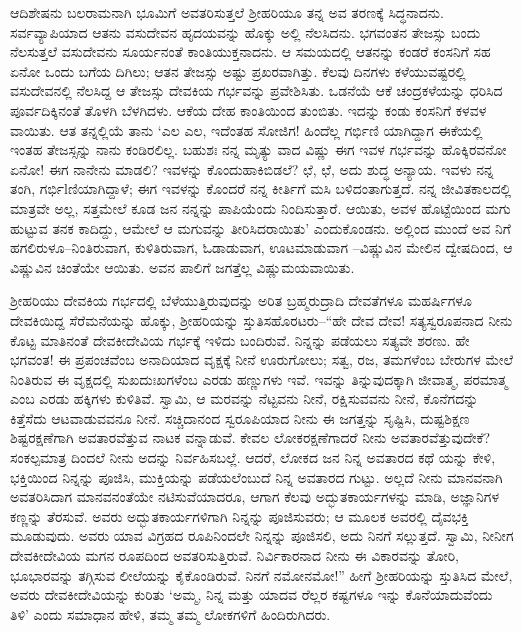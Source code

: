 ಆದಿಶೇಷನು ಬಲರಾಮನಾಗಿ ಭೂಮಿಗೆ ಅವತರಿಸುತ್ತಲೆ ಶ್ರೀಹರಿಯೂ ತನ್ನ ಅವ ತರಣಕ್ಕೆ ಸಿದ್ಧನಾದನು. ಸರ್ವವ್ಯಾಪಿಯಾದ ಆತನು ವಸುದೇವನ ಹೃದಯವನ್ನು ಹೊಕ್ಕು ಅಲ್ಲಿ ನೆಲಸಿದನು. ಭಗವಂತನ ತೇಜಸ್ಸು ಬಂದು ನೆಲಸುತ್ತಲೆ ವಸುದೇವನು ಸೂರ್ಯನಂತೆ ಕಾಂತಿಯುಕ್ತನಾದನು. ಆ ಸಮಯದಲ್ಲಿ ಆತನನ್ನು ಕಂಡರೆ ಕಂಸನಿಗೆ ಸಹ ಏನೋ ಒಂದು ಬಗೆಯ ದಿಗಿಲು; ಆತನ ತೇಜಸ್ಸು ಅಷ್ಟು ಪ್ರಖರವಾಗಿತ್ತು. ಕೆಲವು ದಿನಗಳು ಕಳೆಯುವಷ್ಟರಲ್ಲಿ ವಸುದೇವನಲ್ಲಿ ನೆಲಸಿದ್ದ ಆ ತೇಜಸ್ಸು ದೇವಕಿಯ ಗರ್ಭವನ್ನು ಪ್ರವೇಶಿಸಿತು. ಒಡನೆಯೆ ಆಕೆ ಚಂದ್ರಕಳೆಯನ್ನು ಧರಿಸಿದ ಪೂರ್ವದಿಕ್ಕಿನಂತೆ ತೊಳಗಿ ಬೆಳಗಿದಳು. ಆಕೆಯ ದೇಹ ಕಾಂತಿಯಿಂದ ತುಂಬಿತು. ಇದನ್ನು ಕಂಡು ಕಂಸನಿಗೆ ಕಳವಳ ವಾಯಿತು. ಆತ ತನ್ನಲ್ಲಿಯೆ ತಾನು ‘ಎಲ ಎಲ, ಇದೆಂತಹ ಸೋಜಿಗ! ಹಿಂದೆಲ್ಲ ಗರ್ಭಿಣಿ ಯಾಗಿದ್ದಾಗ ಈಕೆಯಲ್ಲಿ ಇಂತಹ ತೇಜಸ್ಸನ್ನು ನಾನು ಕಂಡಿರಲಿಲ್ಲ. ಬಹುಶಃ ನನ್ನ ಮೃತ್ಯು ವಾದ ವಿಷ್ಣು ಈಗ ಇವಳ ಗರ್ಭವನ್ನು ಹೊಕ್ಕಿರವನೋ ಏನೋ! ಈಗ ನಾನೇನು ಮಾಡಲಿ? ಇವಳನ್ನು ಕೊಂದುಹಾಕಿಬಿಡಲೆ? ಛೆ, ಛೆ, ಅದು ಶುದ್ಧ ಅನ್ಯಾಯ. ಇವಳು ನನ್ನ ತಂಗಿ, ಗರ್ಭಿlಣಿಯಾಗಿದ್ದಾಳೆ; ಈಗ ಇವಳನ್ನು ಕೊಂದರೆ ನನ್ನ ಕೀರ್ತಿಗೆ ಮಸಿ ಬಳಿದಂತಾಗುತ್ತದೆ. ನನ್ನ ಜೀವಿತಕಾಲದಲ್ಲಿ ಮಾತ್ರವೇ ಅಲ್ಲ, ಸತ್ತಮೇಲೆ ಕೂಡ ಜನ ನನ್ನನ್ನು ಪಾಪಿಯೆಂದು ನಿಂದಿಸುತ್ತಾರೆ. ಆಯಿತು, ಅವಳ ಹೊಟ್ಟೆಯಿಂದ ಮಗು ಹುಟ್ಟುವ ತನಕ ಕಾದಿದ್ದು, ಆಮೇಲೆ ಆ ಮಗುವನ್ನು ತೀರಿಸಿದರಾಯಿತು’ ಎಂದುಕೊಂಡನು. ಅಲ್ಲಿಂದ ಮುಂದೆ ಅವ ನಿಗೆ ಹಗಲಿರುಳೂ–ನಿಂತಿರುವಾಗ, ಕುಳಿತಿರುವಾಗ, ಓಡಾಡುವಾಗ, ಊಟಮಾಡುವಾಗ –ವಿಷ್ಣುವಿನ ಮೇಲಿನ ದ್ವೇಷದಿಂದ, ಆ ವಿಷ್ಣುವಿನ ಚಿಂತೆಯೇ ಆಯಿತು. ಅವನ ಪಾಲಿಗೆ ಜಗತ್ತೆಲ್ಲ ವಿಷ್ಣುಮಯವಾಯಿತು.

ಶ್ರೀಹರಿಯು ದೇವಕಿಯ ಗರ್ಭದಲ್ಲಿ ಬೆಳೆಯುತ್ತಿರುವುದನ್ನು ಅರಿತ ಬ್ರಹ್ಮರುದ್ರಾದಿ ದೇವತೆಗಳೂ ಮಹರ್ಷಿಗಳೂ ದೇವಕಿಯಿದ್ದ ಸೆರೆಮನೆಯನ್ನು ಹೊಕ್ಕು, ಶ್ರೀಹರಿಯನ್ನು ಸ್ತುತಿಸಹೊರಟರು–“ಹೇ ದೇವ ದೇವ! ಸತ್ಯಸ್ವರೂಪನಾದ ನೀನು ಕೊಟ್ಟ ಮಾತಿನಂತೆ ದೇವಕೀದೇವಿಯ ಗರ್ಭಕ್ಕೆ ಇಳಿದು ಬಂದಿರುವೆ. ನಿನ್ನನ್ನು ಪಡೆಯಲು ಸತ್ಯವೇ ಶರಣು. ಹೇ ಭಗವಂತ! ಈ ಪ್ರಪಂಚವೆಂಬ ಅನಾದಿಯಾದ ವೃಕ್ಷಕ್ಕೆ ನೀನೆ ಊರುಗೋಲು; ಸತ್ವ, ರಜ, ತಮಗಳೆಂಬ ಬೇರುಗಳ ಮೇಲೆ ನಿಂತಿರುವ ಈ ವೃಕ್ಷದಲ್ಲಿ ಸುಖದುಃಖಗಳೆಂಬ ಎರಡು ಹಣ್ಣುಗಳು ಇವೆ. ಇವನ್ನು ತಿನ್ನುವುದಕ್ಕಾಗಿ ಜೀವಾತ್ಮ, ಪರಮಾತ್ಮ ಎಂಬ ಎರಡು ಹಕ್ಕಿಗಳು ಕುಳಿತಿವೆ. ಸ್ವಾಮಿ, ಆ ಮರವನ್ನು ನೆಟ್ಟವನು ನೀನೆ, ರಕ್ಷಿಸುವವನು ನೀನೆ, ಕೊನೆಗದನ್ನು ಕಿತ್ತೆಸೆದು ಆಟವಾಡುವವನೂ ನೀನೆ. ಸಚ್ಚಿದಾನಂದ ಸ್ವರೂಪಿಯಾದ ನೀನು ಈ ಜಗತ್ತನ್ನು ಸೃಷ್ಟಿಸಿ, ದುಷ್ಟಶಿಕ್ಷಣ ಶಿಷ್ಟರಕ್ಷಣೆಗಾಗಿ ಅವತಾರವೆತ್ತುವ ನಾಟಕ ವನ್ನಾಡುವೆ. ಕೇವಲ ಲೋಕರಕ್ಷಣೆಗಾದರೆ ನೀನು ಅವತಾರವೆತ್ತುವುದೇಕೆ? ಸಂಕಲ್ಪಮಾತ್ರ ದಿಂದಲೆ ನೀನು ಅದನ್ನು ನಿರ್ವಹಿಸಬಲ್ಲೆ. ಆದರೆ, ಲೋಕದ ಜನ ನಿನ್ನ ಅವತಾರದ ಕಥೆ ಯನ್ನು ಕೇಳಿ, ಭಕ್ತಿಯಿಂದ ನಿನ್ನನ್ನು ಪೂಜಿಸಿ, ಮುಕ್ತಿಯನ್ನು ಪಡೆಯಲೆಂಬುದೆ ನಿನ್ನ ಅವತಾರದ ಗುಟ್ಟು. ಅಲ್ಲದೆ ನೀನು ಮಾನವನಾಗಿ ಅವತರಿಸಿದಾಗ ಮಾನವನಂತೆಯೇ ನಟಿಸುವೆಯಾದರೂ, ಆಗಾಗ ಕೆಲವು ಅದ್ಭುತಕಾರ್ಯಗಳನ್ನು ಮಾಡಿ, ಅಜ್ಞಾನಿಗಳ ಕಣ್ಣನ್ನು ತೆರಸುವೆ. ಅವರು ಅದ್ಭುತಕಾರ್ಯಗಳಿಗಾಗಿ ನಿನ್ನನ್ನು ಪೂಜಿಸುವರು; ಆ ಮೂಲಕ ಅವರಲ್ಲಿ ದೈವಭಕ್ತಿ ಮೂಡುವುದು. ಅವರು ಯಾವ ವಿಗ್ರಹದ ರೂಪಿನಿಂದಲೇ ನಿನ್ನನ್ನು ಪೂಜಿಸಲಿ, ಅದು ನಿನಗೆ ಸಲ್ಲುತ್ತದೆ. ಸ್ವಾಮಿ, ನೀನೀಗ ದೇವಕೀದೇವಿಯ ಮಗನ ರೂಪದಿಂದ ಅವತರಿಸುತ್ತಿರುವೆ. ನಿರ್ವಿಕಾರನಾದ ನೀನು ಈ ವಿಕಾರವನ್ನು ತೋರಿ, ಭೂಭಾರವನ್ನು ತಗ್ಗಿಸುವ ಲೀಲೆಯನ್ನು ಕೈಕೊಂಡಿರುವೆ. ನಿನಗೆ ನಮೋನಮೋ!” ಹೀಗೆ ಶ್ರೀಹರಿಯನ್ನು ಸ್ತುತಿಸಿದ ಮೇಲೆ, ಅವರು ದೇವಕೀದೇವಿಯನ್ನು ಕುರಿತು ‘ಅಮ್ಮ, ನಿನ್ನ ಮತ್ತು ಯಾದವ ರೆಲ್ಲರ ಕಷ್ಟಗಳೂ ಇನ್ನು ಕೊನೆಯಾದುವೆಂದು ತಿಳಿ’ ಎಂದು ಸಮಾಧಾನ ಹೇಳಿ, ತಮ್ಮ ತಮ್ಮ ಲೋಕಗಳಿಗೆ ಹಿಂದಿರುಗಿದರು.

